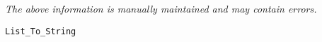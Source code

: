 \label{pkg:list\_to\_string}

{\tiny \it The above information is manually maintained and may contain errors.}
\begin{verbatim}
List_To_String
\end{verbatim}
